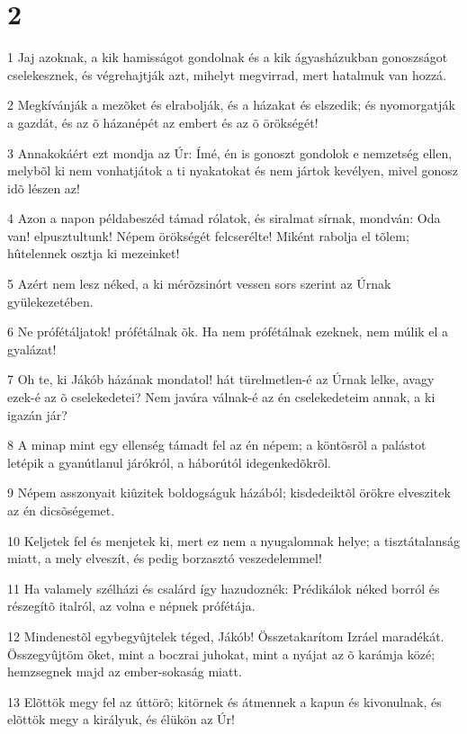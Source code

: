 \chapter{2}

\par 1 Jaj azoknak, a kik hamisságot gondolnak és a kik ágyasházukban gonoszságot cselekesznek, és végrehajtják azt, mihelyt megvirrad, mert hatalmuk van hozzá.
\par 2 Megkívánják a mezõket és elrabolják, és a házakat és elszedik; és nyomorgatják a gazdát, és az õ házanépét az embert és az õ örökségét!
\par 3 Annakokáért ezt mondja az Úr: Ímé, én is gonoszt gondolok e nemzetség ellen, melybõl ki nem vonhatjátok a ti nyakatokat és nem jártok kevélyen, mivel gonosz idõ lészen az!
\par 4 Azon a napon példabeszéd támad rólatok, és siralmat sírnak, mondván: Oda van! elpusztultunk! Népem örökségét felcserélte! Miként rabolja el tõlem; hûtelennek osztja ki mezeinket!
\par 5 Azért nem lesz néked, a ki mérõzsinórt vessen sors szerint az Úrnak gyülekezetében.
\par 6 Ne prófétáljatok! prófétálnak õk. Ha nem prófétálnak ezeknek, nem múlik el a gyalázat!
\par 7 Oh te, ki Jákób házának mondatol! hát türelmetlen-é az Úrnak lelke, avagy ezek-é az õ cselekedetei? Nem javára válnak-é az én cselekedeteim annak, a ki igazán jár?
\par 8 A minap mint egy ellenség támadt fel az én népem; a köntösrõl a palástot letépik a gyanútlanul járókról, a háborútól idegenkedõkrõl.
\par 9 Népem asszonyait kiûzitek boldogságuk házából; kisdedeiktõl örökre elveszitek az én dicsõségemet.
\par 10 Keljetek fel és menjetek ki, mert ez nem a nyugalomnak helye; a tisztátalanság miatt, a mely elveszít, és pedig borzasztó veszedelemmel!
\par 11 Ha valamely szélházi és csalárd így hazudoznék: Prédikálok néked borról és részegítõ italról, az volna e népnek prófétája.
\par 12 Mindenestõl egybegyûjtelek téged, Jákób! Összetakarítom Izráel maradékát. Összegyûjtöm õket, mint a boczrai juhokat, mint a nyájat az õ karámja közé; hemzsegnek majd az ember-sokaság miatt.
\par 13 Elõttök megy fel az úttörõ; kitörnek és átmennek a kapun és kivonulnak, és elõttök megy a királyuk, és élükön az Úr!

